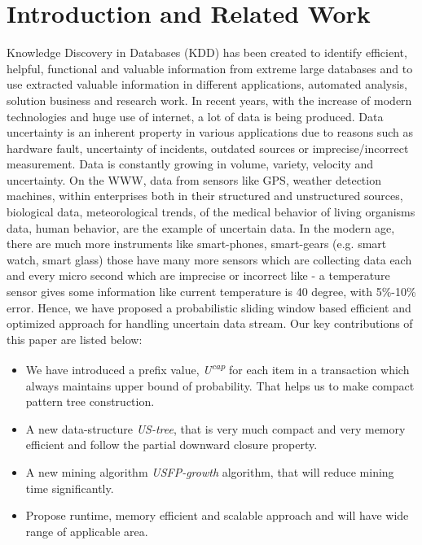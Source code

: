 \documentclass[conference]{IEEEtran}
\begin{document}
\section{Introduction and Related Work}\label{Related_work}
Knowledge Discovery in Databases (KDD) has been created to identify efficient, helpful, functional and valuable information from extreme large databases and to use extracted valuable information in different applications, automated analysis, solution business and research work. In recent years, with the increase of modern technologies and huge use of internet, a lot of data is being produced.
Data uncertainty is an inherent property in various applications due to reasons such as hardware fault, uncertainty of incidents, outdated sources or imprecise/incorrect measurement. Data is constantly growing in volume, variety, velocity and uncertainty. On the WWW, data from sensors like GPS, weather detection machines, within enterprises both in their structured and unstructured sources, biological data, meteorological trends, of the medical behavior of living organisms data, human behavior, are the example of uncertain data.
In the modern age, there are much more instruments like smart-phones, smart-gears (e.g. smart watch, smart glass) those have many more sensors which are collecting data each and every micro second which are imprecise or incorrect like - a temperature sensor gives some information like current temperature is 40 degree, with 5\%-10\% error. Hence, we have proposed a probabilistic sliding window based efficient and optimized approach for handling uncertain data stream.
Our key contributions of this paper are listed below:
\begin{itemize}
  \item We have introduced a prefix value, \emph{U\textsuperscript{cap}} for each item in a transaction which always maintains upper bound of probability. That helps us to make compact pattern tree construction.
  \item A new data-structure \emph{US-tree}, that is very much compact and very memory efficient and follow the partial downward closure property.
  \item A new mining algorithm \emph{USFP-growth} algorithm, that will reduce mining time significantly.
  \item Propose runtime, memory efficient and scalable approach and will have wide range of applicable area.
  \end{itemize}
\end{document}
